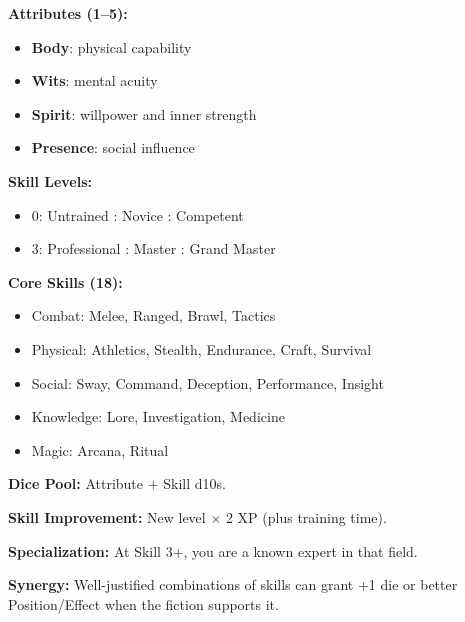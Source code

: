 \begin{tcolorbox}[colback=blue!5!white,colframe=blue!75!black,title=Attributes and Skills Quick Reference,fonttitle=\bfseries,breakable]
\textbf{Attributes (1--5):}
\begin{itemize}
  \item \textbf{Body}: physical capability
  \item \textbf{Wits}: mental acuity
  \item \textbf{Spirit}: willpower and inner strength
  \item \textbf{Presence}: social influence
\end{itemize}

\textbf{Skill Levels:}
\begin{itemize}
  \item 0: Untrained : Novice : Competent
  \item 3: Professional : Master : Grand Master
\end{itemize}

\textbf{Core Skills (18):}
\begin{itemize}
  \item Combat: Melee, Ranged, Brawl, Tactics
  \item Physical: Athletics, Stealth, Endurance, Craft, Survival
  \item Social: Sway, Command, Deception, Performance, Insight
  \item Knowledge: Lore, Investigation, Medicine
  \item Magic: Arcana, Ritual
\end{itemize}

\textbf{Dice Pool:} Attribute $+$ Skill d10s.

\textbf{Skill Improvement:} New level $\times$ 2 XP (plus training time).

\textbf{Specialization:} At Skill 3+, you are a known expert in that field.

\textbf{Synergy:} Well-justified combinations of skills can grant +1 die or
better Position/Effect when the fiction supports it.
\end{tcolorbox}